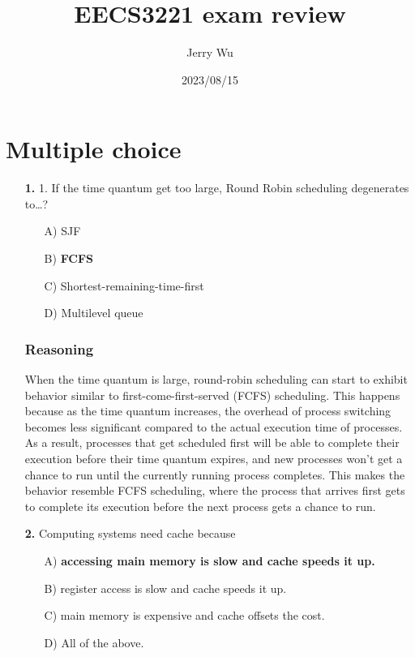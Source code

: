 \documentclass[12pt]{book}
\title{EECS3221 exam review}
\author{Jerry Wu}
\date{2023/08/15}
\begin{document}
    \maketitle

    \chapter*{Multiple choice}
    \begin{itemize}
        \item[\textbf{1.}] 1. If the time quantum get too large, Round Robin scheduling degenerates to\ldots?
        \begin{itemize}
            \item[A)] SJF
            \item[B)] \textbf{FCFS}
            \item[C)] Shortest-remaining-time-first
            \item[D)] Multilevel queue
        \end{itemize}

        \subsection*{Reasoning}

        When the time quantum is large, round-robin scheduling can start to exhibit behavior similar to first-come-first-served (FCFS) scheduling. This happens because as the time quantum increases, the overhead of process switching becomes less significant compared to the actual execution time of processes. As a result, processes that get scheduled first will be able to complete their execution before their time quantum expires, and new processes won't get a chance to run until the currently running process completes. This makes the behavior resemble FCFS scheduling, where the process that arrives first gets to complete its execution before the next process gets a chance to run.

        \item[\textbf{2.}] Computing systems need cache because
        
        \begin{itemize}
            \item[A)] \textbf{accessing main memory is slow and cache speeds it up.}
            \item[B)] register access is slow and cache speeds it up.
            \item[C)] main memory is expensive and cache offsets the cost.
            \item[D)] All of the above.
        \end{itemize}


\end{itemize}
\end{document}

